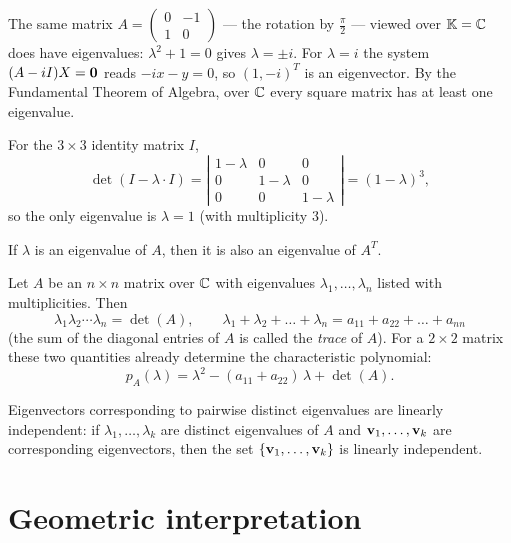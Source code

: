 \begin{example}
The same matrix $A = \left( \begin{smallmatrix} 0 & -1\\ 1 & 0 \end{smallmatrix} \right)$ — the rotation by
$\tfrac\pi2$ — viewed over $\mathbb{K} = \mathbb{C}$ does have eigenvalues: $\lambda^2+1 = 0$ gives $\lambda = \pm i$. For
$\lambda = i$ the system $(A-iI)X=\mathbf{0}$ reads $-ix - y = 0$, so $(1,-i)^T$ is an eigenvector. By the
Fundamental Theorem of Algebra, over $\mathbb{C}$ every square matrix has at least one eigenvalue.
\end{example}

\begin{example}
For the $3\times 3$ identity matrix $I$,
\[
\det(I-\lambda\cdot I) = \left| \begin{array}{ccc} 1-\lambda & 0 & 0\\ 0 & 1-\lambda & 0 \\ 0 & 0 & 1-\lambda \end{array} \right| = (1-\lambda)^3,
\]
so the only eigenvalue is $\lambda = 1$ (with multiplicity $3$).
\end{example}

\begin{fact}
If $\lambda$ is an eigenvalue of $A$, then it is also an eigenvalue of $A^T$.
\end{fact}

\begin{fact}
Let $A$ be an $n\times n$ matrix over $\mathbb{C}$ with eigenvalues $\lambda_1,\ldots,\lambda_n$ listed with
multiplicities. Then
\[
\lambda_1 \lambda_2 \cdots \lambda_n = \det(A), \qquad
\lambda_1+ \lambda_2 +\ldots+ \lambda_n = a_{11}+a_{22}+\ldots+a_{nn}
\]
(the sum of the diagonal entries of $A$ is called the \emph{trace} of $A$). For a $2\times 2$ matrix these
two quantities already determine the characteristic polynomial:
\[
p_A(\lambda) = \lambda^2 - (a_{11}+a_{22})\,\lambda + \det(A).
\]
\end{fact}

\begin{theorem}
Eigenvectors corresponding to pairwise distinct eigenvalues are linearly independent: if
$\lambda_1,\ldots,\lambda_k$ are distinct eigenvalues of $A$ and $\mathbf{v}_1,\ldots,\mathbf{v}_k$ are corresponding
eigenvectors, then the set $\{\mathbf{v}_1,\ldots,\mathbf{v}_k\}$ is linearly independent.
\end{theorem}

\section{Geometric interpretation}

